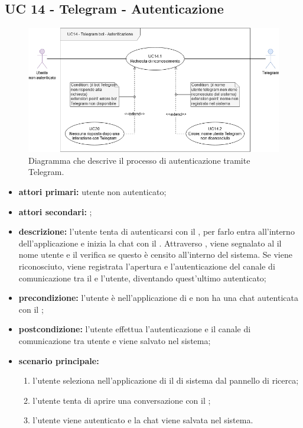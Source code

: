 \subsection{UC 14 - Telegram - Autenticazione}

	\begin{figure}[H]
		\centering
		\includegraphics[scale=0.60]{res/images/uc14}
		\caption{Diagramma che descrive il processo di autenticazione tramite Telegram.}
	\end{figure}

	\begin{itemize}
		\item \textbf{attori primari:} utente non autenticato;
		\item \textbf{attori secondari:} ;
		\item \textbf{descrizione:} l'utente tenta di autenticarsi con il  , per farlo entra all'interno dell'applicazione e inizia la chat con il . Attraverso , viene segnalato al  il nome utente e il  verifica se questo è censito all'interno del sistema. Se viene riconosciuto, viene registrata l'apertura e l'autenticazione del canale di comunicazione tra il  e l'utente, diventando quest'ultimo autenticato;
		\item \textbf{precondizione:} l'utente è nell'applicazione di  e non ha una chat autenticata con il ;
		\item \textbf{postcondizione:} l'utente effettua l'autenticazione e il canale di comunicazione tra utente e  viene salvato nel sistema;
		\item \textbf{scenario principale:}
		\begin{enumerate}
			\item l'utente seleziona nell'applicazione di  il  di sistema dal pannello di ricerca;
			\item l'utente tenta di aprire una conversazione con il ;
			\item l'utente viene autenticato e la chat viene salvata nel sistema.
		\end{enumerate}
	\end{itemize}

